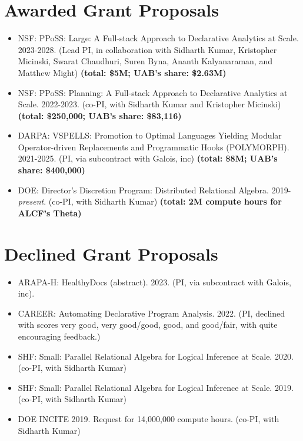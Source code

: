 \documentclass[line]{res}
\begin{document}
\begin{resume}


\section{\large Awarded Grant Proposals} \vspace{0.45cm}

\begin{itemize}
  \item
  NSF: PPoSS: Large: A Full-stack Approach to Declarative Analytics at Scale. 2023-2028. (Lead PI, in collaboration with Sidharth Kumar, Kristopher Micinski, Swarat Chaudhuri, Suren Byna, Ananth Kalyanaraman, and Matthew Might) \textbf{(total: \$5M; UAB's share: \$2.63M)} 
  \item
  NSF: PPoSS: Planning: A Full-stack Approach to Declarative Analytics at Scale. 2022-2023. (co-PI, with Sidharth Kumar and Kristopher Micinski) \textbf{(total: \$250,000; UAB's share: \$83,116)} 
  \item
  DARPA: VSPELLS: Promotion to Optimal Languages Yielding Modular Operator-driven Replacements and Programmatic Hooks (POLYMORPH). 2021-2025. (PI, via subcontract with Galois, inc) \textbf{(total: \$8M; UAB's share: \$400,000)}
  \item
  DOE: Director's Discretion Program: Distributed Relational Algebra. 2019-\textit{present}. (co-PI, with Sidharth Kumar) \textbf{(total: 2M compute hours for ALCF's Theta)}
\end{itemize}

\section{\large Declined Grant Proposals} \vspace{0.5cm}

\begin{itemize}  
  \item
  ARAPA-H: HealthyDocs (abstract). 2023. (PI, via subcontract with Galois, inc).
  \item
  CAREER: Automating Declarative Program Analysis. 2022. (PI, declined with scores very good, very good/good, good, and good/fair, with quite encouraging feedback.) 
  \item
  SHF: Small: Parallel Relational Algebra for Logical Inference at Scale. 2020. (co-PI, with Sidharth Kumar) 
  \item
  SHF: Small: Parallel Relational Algebra for Logical Inference at Scale. 2019. (co-PI, with Sidharth Kumar)
  \item
  DOE INCITE 2019. Request for 14,000,000 compute hours. (co-PI, with Sidharth Kumar)  
\end{itemize}


\end{resume}
\end{document}
